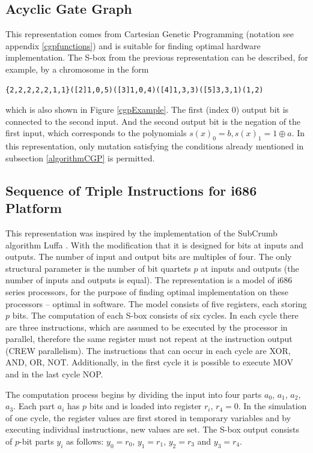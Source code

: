 \subsection{Acyclic Gate Graph}
This representation comes from Cartesian Genetic Programming (notation see appendix \ref{cgpfunctions})
and is suitable for finding optimal hardware implementation.
The S-box from the previous representation can be described, for example, by a chromosome in the form
\begin{verbatim}
{2,2,2,2,2,1,1}([2]1,0,5)([3]1,0,4)([4]1,3,3)([5]3,3,1)(1,2)
\end{verbatim}
which is also shown in Figure \ref{cgpExample}.
The first (index 0) output bit is connected to the second input. And the second output bit is the negation
of the first input, which corresponds to the polynomials $s(x)_0 = b , s(x)_1 = 1 \oplus a$.
In this representation, only mutation satisfying the conditions already mentioned
in subsection \ref{algorithmCGP} is permitted.

\subsection{Sequence of Triple Instructions for i686 Platform}\label{secAbouti686}
This representation was inspired by the implementation of the SubCrumb algorithm Luffa \cite{specLuffa}.
With the modification that it is designed for bits at inputs and outputs.
The number of input and output bits are multiples of four.
The only structural parameter is the number of bit quartets $p$ at inputs and outputs (the number of inputs and outputs is equal).
The representation is a model of i686 series processors, for the purpose of finding optimal implementation on
these processors -- optimal in software. The model consists of five registers, each storing $p$ bits.
The computation of each S-box consists of six cycles. In each cycle there are three instructions, which
are assumed to be executed by the processor in parallel, therefore the same
register must not repeat at the instruction output (CREW parallelism). The instructions that can occur in each cycle are
XOR, AND, OR, NOT. Additionally, in the first cycle it is possible to execute MOV and in the last cycle NOP.

The computation process begins by dividing the input into four parts $a_0$, $a_1$, $a_2$, $a_3$.
Each part $a_i$ has $p$ bits and is loaded into register $r_i$, $r_4 = 0$.
In the simulation of one cycle, the register values are first stored in temporary variables and by executing individual
instructions, new values are set. The S-box output consists of $p$-bit parts $y_i$
as follows: $y_0 = r_0$, $y_1 = r_1$, $y_2 = r_3$ and $y_3 = r_4$.

